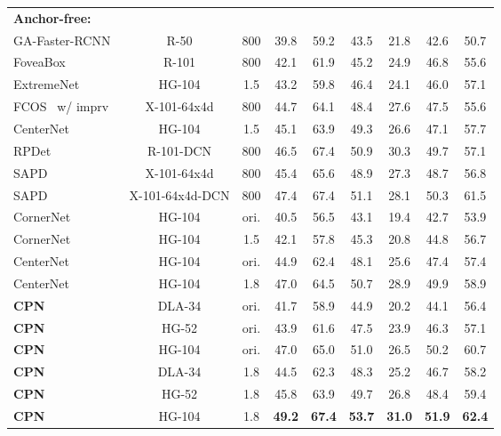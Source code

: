 \documentclass[runningheads]{llncs}
\begin{document}
\begin{table}[!t]
\begin{center}
{\begin{tabular}{|l|c|c|cccccc|}
\hline
\hline
\textbf{Anchor-free:} & & & & & & & &\\
GA-Faster-RCNN~\cite{wang2019region} & R-50 & 800 & 39.8 & 59.2 & 43.5 & 21.8 & 42.6 & 50.7\\
FoveaBox~\cite{kong2020foveabox} & R-101 & 800 & 42.1 & 61.9 & 45.2 & 24.9 & 46.8 & 55.6\\
ExtremeNet~\cite{zhou2019bottom}~ & HG-104 & 1.5 & 43.2 & 59.8 & 46.4 & 24.1 & 46.0 & 57.1\\
FCOS~\cite{tian2019fcos} w/ imprv & X-101-64x4d & 800 & 44.7 & 64.1 & 48.4 & 27.6 & 47.5 & 55.6\\
CenterNet~\cite{zhou2019objects}~ & HG-104 & 1.5 & 45.1 & 63.9 & 49.3 & 26.6 & 47.1 & 57.7\\
RPDet~\cite{yang2019reppoints}~ & R-101-DCN & 800 & 46.5 & 67.4 & 50.9 & 30.3 & 49.7 & 57.1\\
SAPD~\cite{zhu2019soft} & X-101-64x4d & 800 & 45.4 & 65.6 & 48.9 & 27.3 & 48.7 & 56.8\\
SAPD~\cite{zhu2019soft} & X-101-64x4d-DCN & 800 & 47.4 & 67.4 & 51.1 & 28.1 & 50.3 & 61.5\\
\hline
CornerNet~\cite{law2018cornernet} & HG-104 & ori. & 40.5 & 56.5 & 43.1 & 19.4 & 42.7 & 53.9\\
CornerNet~\cite{law2018cornernet}~ & HG-104 & 1.5 & 42.1 & 57.8 & 45.3 & 20.8 & 44.8 & 56.7\\
CenterNet~\cite{duan2019centernet}& HG-104 & ori. & 44.9 & 62.4 & 48.1 & 25.6 & 47.4 & 57.4\\
CenterNet~\cite{duan2019centernet}~ & HG-104 & 1.8 & 47.0 & 64.5 & 50.7 & 28.9 & 49.9 & 58.9\\
\hline
\rowcolor{black!20}
\textbf{CPN} & DLA-34 & ori. & 41.7 & 58.9 & 44.9 & 20.2 & 44.1 & 56.4\\
\rowcolor{black!20}
\textbf{CPN} & HG-52 & ori. & 43.9 & 61.6 & 47.5 & 23.9 & 46.3 & 57.1\\
\rowcolor{black!20}
\textbf{CPN} & HG-104 & ori. & 47.0 & 65.0 & 51.0 & 26.5 & 50.2 & 60.7\\
\rowcolor{black!20}
\textbf{CPN}~ & DLA-34 & 1.8 & 44.5 & 62.3 & 48.3 & 25.2 & 46.7 & 58.2\\
\rowcolor{black!20}
\textbf{CPN}~ & HG-52 & 1.8 & 45.8 & 63.9 & 49.7 & 26.8 & 48.4 & 59.4\\
\rowcolor{black!20}
\textbf{CPN}~ & HG-104 & 1.8 & \textbf{49.2} & \textbf{67.4} & \textbf{53.7} & \textbf{31.0} & \textbf{51.9} & \textbf{62.4}\\
\hline
\end{tabular}}
\vspace{-4ex}
\end{center}
\end{table}
\end{document}
